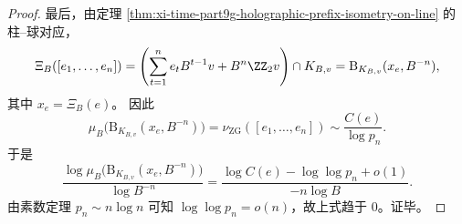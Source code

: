 \begin{proof}
最后，由定理 \ref{thm:xi-time-part9g-holographic-prefix-isometry-on-line} 的柱--球对应，
\[
\Xi_B([e_1,\dots,e_n])
=
\left(\sum_{t=1}^{n}e_tB^{t-1}v+B^n\ZZ_2v\right)\cap K_{B,v}
=
\mathrm B_{K_{B,v}}(x_e,B^{-n}),
\]
其中 \(x_e=\Xi_B(e)\)。
因此
\[
\mu_B\bigl(\mathrm B_{K_{B,v}}(x_e,B^{-n})\bigr)
=
\nu_{\mathrm{ZG}}([e_1,\dots,e_n])
\sim
\frac{C(e)}{\log p_n}.
\]
于是
\[
\frac{\log \mu_B\bigl(\mathrm B_{K_{B,v}}(x_e,B^{-n})\bigr)}{\log B^{-n}}
=
\frac{\log C(e)-\log\log p_n+o(1)}{-n\log B}.
\]
由素数定理 \(p_n\sim n\log n\) 可知 \(\log\log p_n=o(n)\)，故上式趋于 \(0\)。证毕。
\end{proof}





\endinput
